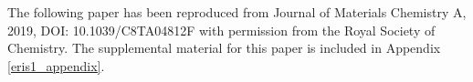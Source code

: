 \documentclass[11pt, twoside]{report}
\begin{document}
The following paper has been reproduced from Journal of Materials Chemistry A, 2019, DOI: 10.1039/C8TA04812F with permission from the Royal Society of Chemistry. The supplemental material for this paper is included in Appendix \ref{eris1_appendix}.



\end{document}
